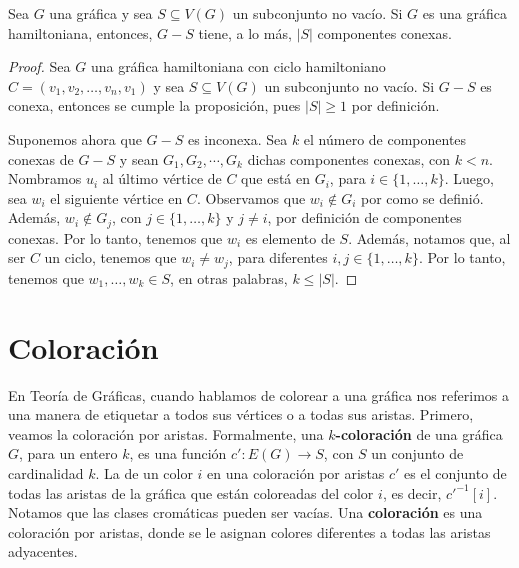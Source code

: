 \begin{proposicion}
\label{prop:hamilt}
   Sea $G$ una gr\'afica y sea $S \subseteq V(G)$ un subconjunto no vac\'io. Si
    $G$ es una gr\'afica hamiltoniana, entonces, $G-S$ tiene, a lo m\'as, $|S|$
    componentes conexas.
\end{proposicion}


\begin{proof}
    Sea $G$ una gr\'afica hamiltoniana con ciclo hamiltoniano $C= (v_1, v_2,
    \dots, v_n, v_1)$ y sea $S \subseteq V(G)$ un subconjunto no vac\'io. Si
    $G-S$ es conexa, entonces se cumple la proposici\'on, pues $|S| \geq 1$ por
    definici\'on.
    
    Suponemos ahora que $G-S$ es inconexa. Sea $k$ el n\'umero de componentes
    conexas de $G-S$ y sean $G_1, G_2, \cdots, G_ k$ dichas componentes conexas,
    con $k < n$. Nombramos $u_i$ al \'ultimo v\'ertice de $C$ que est\'a en
    $G_i$, para $i \in \{1, \dots, k\}$. Luego, sea $w_i$ el siguiente v\'ertice
    en $C$. Observamos que $w_i \notin G_i$ por como se defini\'o. Adem\'as,
    $w_i \notin G_j$, con $j \in \{1, \dots, k\}$ y $j \neq i$, por definici\'on
    de componentes conexas. Por lo tanto, tenemos que $w_i$ es elemento de $S$.
    Adem\'as, notamos que, al ser $C$ un ciclo, tenemos que $w_i \neq w_j$, para
    diferentes $i,j \in \{1, \dots, k\}$. Por lo tanto, tenemos que $w_1, \dots,
    w_k \in S$, en otras palabras, $k \leq |S|$. 
\end{proof} 

\section{Coloraci\'on}
\label{sec:coloracion}

En Teor\'ia de Gr\'aficas, cuando hablamos de colorear a una gr\'afica nos
referimos a una manera de etiquetar a todos sus v\'ertices o a todas sus
aristas. Primero, veamos la coloraci\'on por aristas. Formalmente, una
\textbf{$k$-coloraci\'on}  de una gr\'afica $G$, para un entero $k$,
es una funci\'on $c' \colon E(G)\to S$, con $S$ un conjunto de cardinalidad $k$.
La  de un color $i$ en una coloraci\'on por aristas
$c'$ es el conjunto de todas las aristas de la gr\'afica que est\'an coloreadas
del color $i$, es decir, $c'^{-1}[i]$. Notamos que las clases crom\'aticas
pueden ser vac\'ias. Una \textbf{coloraci\'on}
 es una coloraci\'on por aristas, donde se le asignan colores diferentes
a todas las aristas adyacentes.

